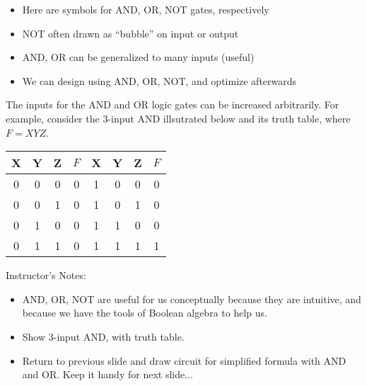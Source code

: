 
\setlength{\columnseprule}{1pt}
\def\columnseprulecolor{\color{blue}}



\begin{frame}[fragile]
\begin{itemize}
	\item Here are symbols for AND, OR, NOT gates, respectively
	\item NOT often drawn as ``bubble'' on input or output
	\item AND, OR can be generalized to many inputs (useful)
	\item We can design using AND, OR, NOT, and optimize afterwards
\end{itemize}
\begin{tcolorbox}[enhanced,attach boxed title to top center={yshift=-3mm,yshifttext=-1mm},
  colback=blue!5!white,colframe=blue!75!black,colbacktitle=blue!80!black,
  title=Think About It,fonttitle=\bfseries,
  boxed title style={size=small,colframe=red!50!black} ]
  {\footnotesize
    The inputs for the AND and OR logic gates can be increased arbitrarily. For example, consider the 3-input AND illsutrated below and its truth table, where $F=XYZ$.}
    \begin{multicols}{2}
    
    \columnbreak
  {\footnotesize
    \begin{tabular}{ccc|c||ccc|c|}
    \hline
        X & Y &Z & $F$ & X & Y &Z & $F$\\
        \hline
        0 & 0 &0 & 0 &1 & 0 &0 & 0 \\
         0 & 0 &1 & 0 &1 & 0 &1 & 0 \\
          0 & 1 &0 & 0 &1 & 1 &0 & 0 \\
 0 & 1 &1 & 0 &1 & 1 &1 & 1 \\
 \hline
     \end{tabular}
     }
    \end{multicols}
\end{tcolorbox}

\BNotes\ifnum{}
Instructor's Notes:
\begin{itemize}
\item
AND, OR, NOT are useful for us conceptually because they are
intuitive, and because we have the tools of Boolean algebra to help
us.
\item Show 3-input AND, with truth table.
\item Return to previous slide and draw circuit for simplified formula
  with AND and OR.  Keep it handy for next slide...
\end{itemize}
\fi\ENotes
\end{frame}

